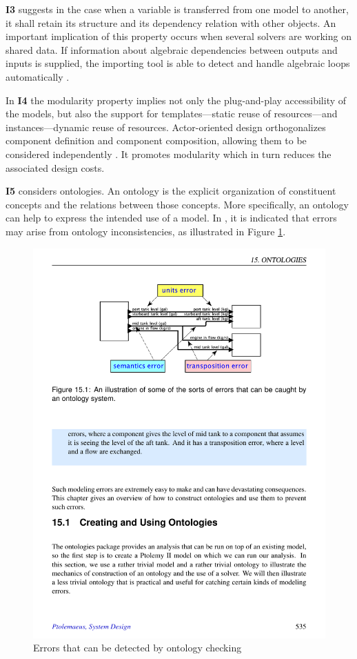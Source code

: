 \textbf{I3} suggests in the case when a variable is transferred from one model to another, it shall retain its structure and its dependency relation with other objects. An important implication of this property occurs when several solvers are working on shared data. If information about algebraic dependencies between outputs and inputs is supplied, the importing tool is able to detect and handle algebraic loops automatically \cite{Blochwitz2011}.
 
In \textbf{I4} the modularity property implies not only the plug-and-play accessibility of the models, but also the support for templates---static reuse of resources---and instances---dynamic reuse of resources. Actor-oriented design orthogonalizes component definition and component composition, allowing them to be considered independently \cite{Lee2004}. It promotes modularity which in turn reduces the associated design costs. 

\textbf{I5} considers ontologies. An ontology is the  explicit organization of constituent concepts and the relations between those concepts. More specifically, an ontology can help to express the intended use of a model. In \cite{Ptolemaeus2014}, it is indicated that errors may arise from ontology inconsistencies, as illustrated in Figure \ref{fig:o2ont}.

\begin{figure}[hbt!]
  \centering
  \includegraphics[scale=0.9]{figures/o2ont.pdf}
  \caption[Errors that can be detected by ontology checking]{Errors that can be detected by ontology checking  \cite{Ptolemaeus2014}}
  \label{fig:o2ont}
\end{figure}

